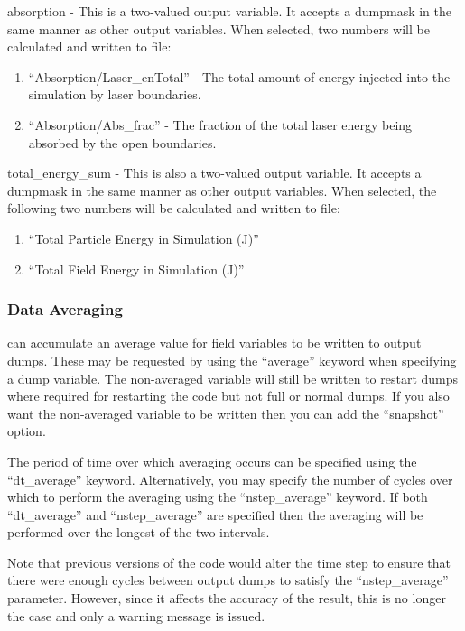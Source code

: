 {\emphtext absorption} - This is a two-valued output variable. It accepts a
  dumpmask in the same manner as other output variables. When selected, two
  numbers will be calculated and written to file:%
\vspace{-1.5mm}\begin{enumerate}
  \itemsep0em
  \item ``Absorption/Laser\_enTotal'' - The total amount of energy injected
  into the simulation by laser boundaries.
  \item ``Absorption/Abs\_frac'' - The fraction of the total laser energy being
  absorbed by the open boundaries.
\end{enumerate}
\vspace{1.5mm}

{\emphtext total\_energy\_sum} - This is also a two-valued output variable. It
  accepts a dumpmask in the same manner as other output variables. When
  selected, the following two numbers will be calculated and written to file:%
\vspace{-1.5mm}\begin{enumerate}
  \itemsep0em
  \item ``Total Particle Energy in Simulation (J)''
  \item ``Total Field Energy in Simulation (J)''
\end{enumerate}

\subsubsection{Data Averaging}
\label{sec:average}
{\EPOCH} can accumulate an average value for field variables to be written
to output dumps. These may be requested by using the ``average'' keyword when
specifying a dump variable. The non-averaged variable will still be written
to restart dumps where required for restarting the code but not full or normal
dumps. If you also want the non-averaged variable to be written then you can
add the ``snapshot'' option.

The period of time over which averaging occurs can be specified using the
``dt\_average'' keyword. Alternatively, you may specify the number of cycles
over which to perform the averaging using the ``nstep\_average'' keyword.
If both ``dt\_average'' and ``nstep\_average'' are specified then the
averaging will be performed over the longest of the two intervals.

Note that previous versions of the code would alter the time step to
ensure that there were enough cycles between output dumps to satisfy the
``nstep\_average'' parameter. However, since it affects the accuracy of
the result, this is no longer the case and only a warning message is issued.

